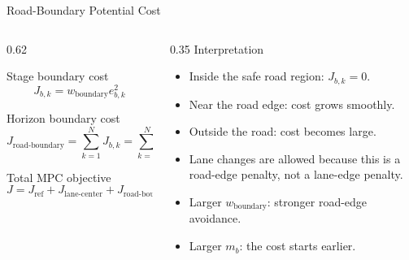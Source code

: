\documentclass[aspectratio=169]{beamer}
\begin{document}
\begin{frame}{Road-Boundary Potential Cost}
\small
\begin{columns}[T,onlytextwidth]
\begin{column}{0.62\textwidth}
\begin{flushleft}
Stage boundary cost
\[
J_{b,k}
=
w_{\mathrm{boundary}} e_{b,k}^{2}
\]

Horizon boundary cost
\[
J_{\mathrm{road\mbox{-}boundary}}
=
\sum_{k=1}^{N} J_{b,k}
=
\sum_{k=1}^{N}
w_{\mathrm{boundary}} e_{b,k}^{2}
\]

Total MPC objective
\[
J =
J_{\mathrm{ref}}
+J_{\mathrm{lane\mbox{-}center}}
+J_{\mathrm{road\mbox{-}boundary}}
+J_{\mathrm{repulsive}}
+J_{\mathrm{control}}
\]
\end{flushleft}
\end{column}

\begin{column}{0.35\textwidth}
Interpretation
\begin{itemize}
\setlength\itemsep{0.3em}
\item Inside the safe road region: $J_{b,k}=0$.
\item Near the road edge: cost grows smoothly.
\item Outside the road: cost becomes large.
\item Lane changes are allowed because this is a road-edge penalty, not a lane-edge penalty.
\item Larger $w_{\mathrm{boundary}}$: stronger road-edge avoidance.
\item Larger $m_b$: the cost starts earlier.
\end{itemize}
\end{column}
\end{columns}
\end{frame}
\end{document}
